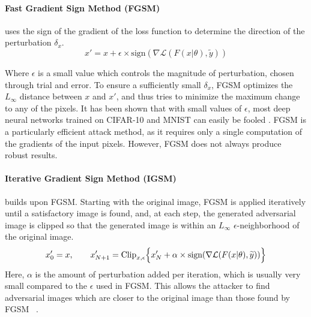 \paragraph{Fast Gradient Sign Method (FGSM)} \cite{Goodfellow2014ExplainingAH} uses the sign of the gradient of the loss function to determine the direction of the perturbation $\delta_x$. 
\[
    x' = x + \epsilon \times \text{sign}(\nabla \mathcal{L} (F(x|\theta),\widetilde{y}))
\]

Where $\epsilon$ is a small value which controls the magnitude of perturbation, chosen through trial and error.
To ensure a sufficiently small $\delta_x$, FGSM optimizes the $L_\infty$ distance between $x$ and $x'$, and thus tries to minimize the maximum change to any of the pixels.
It has been shown that with small values of $\epsilon$, most deep neural networks trained on CIFAR-10 and MNIST can easily be fooled \cite{Goodfellow2014ExplainingAH}.
FGSM is a particularly efficient attack method, as it requires only a single computation of the gradients of the input pixels.
However, FGSM does not always produce robust results.%

\paragraph{Iterative Gradient Sign Method (IGSM)} \cite{Kurakin2016AdversarialEI} builds upon FGSM.
Starting with the original image, FGSM is applied iteratively until a satisfactory image is found, and, at each step, the generated adversarial image is clipped so that the generated image is within an $L_\infty$ $\epsilon$-neighborhood of the original image.
\[
x_0' = x, \qquad x_{N+1}' = \text{Clip}_{x,\epsilon} \Bigl\{x_N' + \alpha \times \text{sign}(\nabla \mathcal{L} (F(x|\theta),\widetilde{y}))  \Bigr\} 
\]
Here, $\alpha$ is the amount of perturbation added per iteration, which is usually very small compared to the $\epsilon$ used in FGSM.
This allows the attacker to find adversarial images which are closer to the original image than those found by FGSM ~\cite{Kurakin2016AdversarialEI}.


